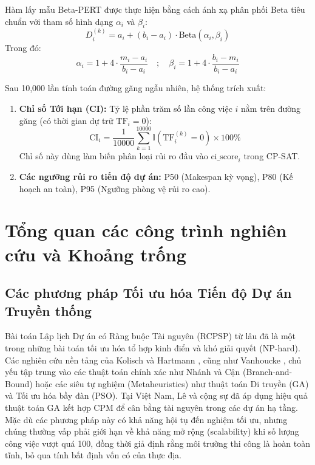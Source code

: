 Hàm lấy mẫu Beta-PERT được thực hiện bằng cách ánh xạ phân phối Beta tiêu chuẩn với tham số hình dạng $\alpha_i$ và $\beta_i$:
\begin{equation}
    D_i^{(k)} = a_i + (b_i - a_i) \cdot \text{Beta}(\alpha_i, \beta_i)
\end{equation}
Trong đó:
\begin{equation}
    \alpha_i = 1 + 4 \cdot \frac{m_i - a_i}{b_i - a_i} \quad ; \quad \beta_i = 1 + 4 \cdot \frac{b_i - m_i}{b_i - a_i}
\end{equation}

Sau 10,000 lần tính toán đường găng ngẫu nhiên, hệ thống trích xuất:
\begin{enumerate}
    \item \textbf{Chỉ số Tới hạn (CI):} Tỷ lệ phần trăm số lần công việc $i$ nằm trên đường găng (có thời gian dự trữ $\mathrm{TF}_i = 0$):
    \begin{equation}
        \text{CI}_i = \frac{1}{10000} \sum_{k=1}^{10000} \mathbb{I}\left(\mathrm{TF}_i^{(k)} = 0\right) \times 100\%
    \end{equation}
    Chỉ số này dùng làm biến phân loại rủi ro đầu vào $\text{ci\_score}_i$ trong CP-SAT.
    \item \textbf{Các ngưỡng rủi ro tiến độ dự án:} P50 (Makespan kỳ vọng), P80 (Kế hoạch an toàn), P95 (Ngưỡng phòng vệ rủi ro cao).
\end{enumerate}

\section{Tổng quan các công trình nghiên cứu và Khoảng trống}
\subsection{Các phương pháp Tối ưu hóa Tiến độ Dự án Truyền thống}
Bài toán Lập lịch Dự án có Ràng buộc Tài nguyên (RCPSP) từ lâu đã là một trong những bài toán tối ưu hóa tổ hợp kinh điển và khó giải quyết (NP-hard). Các nghiên cứu nền tảng của Kolisch và Hartmann \cite{kolisch1997psplib}, cũng như Vanhoucke \cite{vanhoucke2016integrated}, chủ yếu tập trung vào các thuật toán chính xác như Nhánh và Cận (Branch-and-Bound) hoặc các siêu tự nghiệm (Metaheuristics) như thuật toán Di truyền (GA) và Tối ưu hóa bầy đàn (PSO). Tại Việt Nam, Lê và cộng sự \cite{le_2020_cpm} đã áp dụng hiệu quả thuật toán GA kết hợp CPM để cân bằng tài nguyên trong các dự án hạ tầng. Mặc dù các phương pháp này có khả năng hội tụ đến nghiệm tối ưu, nhưng chúng thường vấp phải giới hạn về khả năng mở rộng (scalability) khi số lượng công việc vượt quá 100, đồng thời giả định rằng môi trường thi công là hoàn toàn tĩnh, bỏ qua tính bất định vốn có của thực địa.

